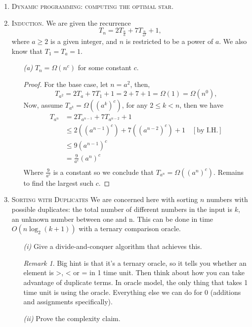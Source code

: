 \documentclass[12pt]{article}
\theoremstyle{definition}
\theoremstyle{remark}
\newtheorem*{remark}{Remark}
\begin{document}
\begin{enumerate}
  \newpage 
  \item \textsc{Dynamic programming: computing the optimal star.}  
  \newpage  
  \item \textsc{Induction.} We are given the recurrence 
  $$T_n = 2 T_{\frac{n}{a}} + 7 T_{\frac{n}{a^2}} + 1,$$
  where $a \geq 2$ is a given integer, and $n$ is restricted to be a power of $a$. We also know that $T_1 = T_a = 1$.\newline
  \begin{enumerate}
    \item[\it (a)] $T_n = \Omega(n^c)$ for some constant $c.$
\begin{proof} For the base case, let $n = a^2$, then, 
  $$T_{a^2} = 2 T_a + 7T_1 + 1 = 2 + 7  + 1 = \Omega(1) = \Omega(n^0), $$
  Now, assume $T_{a^k} = \Omega ((a^k)^c)$, for any $2\leq k < n$, then we have 
  \begin{equation*}
    \begin{split}
      T_{a^n} &= 2 T_{a^{n-1}} + 7T_{a^{n-2}} + 1\\ 
      &\leq 2 ((a^{n-1})^c) + 7((a^{n-2})^c) + 1 \quad [\text{by I.H.}]\\ 
      & \leq 9 (a^{n-1})^c \\
      & = \frac{9}{a^c} \left( a^n\right)^c \\ 
    \end{split}
  \end{equation*}
  Where $\frac{9}{a^c} $ is a constant so we conclude that $T_{a^n} = \Omega ((a^n)^c)$. Remains to find the largest such $c.$ 
\end{proof}
  \end{enumerate}
  \newpage
  \item  \textsc{Sorting with Duplicates} We are concerned here with sorting $n$ numbers with possible duplicates: the total number of different numbers in the input is $k$, an unknown number between one and n. This can be done in time $O(n \log_2(k + 1))$ with a ternary comparison oracle. 
  \begin{enumerate}
    \item[\it (i)] Give a divide-and-conquer algorithm that achieves this. 
\begin{remark} 
    Big hint is that it's a ternary oracle, so it tells you whether an element is >, < or = in 1 time unit. Then think about how you can take advantage of duplicate terms. In oracle model, the only thing that takes 1 time unit is using the oracle. Everything else we can do for 0 (additions and assignments specifically).


\end{remark}
    \item[\it (ii)] Prove the complexity claim.

  \end{enumerate}

\end{enumerate}
 
\end{document}
